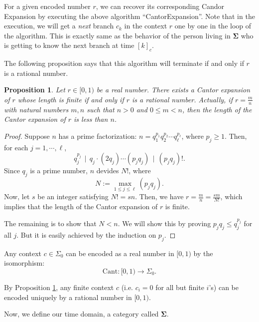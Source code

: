 \documentclass[12pt, a4paper]{amsart}
\theoremstyle{plain}
\newtheorem{prop}[thm]{Proposition}
\theoremstyle{definition}
\numberwithin{figure}{section}
\numberwithin{table}{section}
\newcommand{\lspace} {
  \vspace{0.8\baselineskip}
}
\newcommand{\twc}[2]{ %
  [ #1 ]_{ #2 }
}
\numberwithin{equation}{section}
\newcommand{\bSigma}{\mathbf{\Sigma}}
\begin{document}
For a given encoded number
$r$,
we can recover its corresponding Candor Expansion by executing the above algorithm ``CantorExpansion''.
Note that in the execution, we will get a \textit{next} branch $c_k$ in the context $r$ one by one in the loop of the algorithm.
This is exactly same as the behavior of the person living in $\bSigma$ who is getting to know the next branch at time 
$\twc{k}{c}$.



The following proposition says that this algorithm will terminate if and only if 
$r$ is a rational number.

\begin{prop}
\label{prop:RatCantorExp}
Let 
$r
	\in [0, 1)
$
be a real number.
There exists a 
Cantor expansion of $r$ 
whose length is finite if and only if
$r$ is a rational number.
Actually, if 
$
r = \frac{m}{n}
$
with natural numbers
$m, n$
such that
$n > 0$ and $0 \le m < n$,
then
the length of the Cantor expansion of $r$ is less than $n$.
\end{prop}
\begin{proof}
Suppose $n$
has a prime factorization:
$
n = 
q_1^{p_1}
q_2^{p_2}
	\cdots
q_{\ell}^{p_{\ell}}
$,
where
$p_j \ge 1$.
Then, for each
$j = 1, \cdots, \ell$,
\[
q_j^{p_j}
	\, \mid \,
q_j \cdot
(2  q_j)
	\cdots
(p_j  q_j)
	\, \mid \,
(p_j  q_j)! .
\]
Since 
$q_j$
is a prime number,
$n$
devides
$
N!
$,
where
\[
N
	:=
\max_{1 \le j \le \ell}
	(p_j  q_j) .
\]
Now,
let $s$
be an integer satisfying
$
N! = sn
$.
Then,
we have
$
r
	=
\frac{m}{n}
	=
\frac{sm}{N!}
$,
which implies that the length of the Cantor expansion of $r$ is finite.

The remaining is to show  that
$
N < n
$.
We will show this by proving 
$
p_j q_j \le q_j^{p_j}
$
for all $j$.
But it is easily achieved by the induction on
$p_j$.

\end{proof}


Any context 
$c \in \Sigma_0$
can be encoded as a real number in
$[0,1)$
by the isomorphism:
\[
\mathrm{Cant}
	:
[0,1)
	\to
\Sigma_0 .
\]

By Proposition \ref{prop:RatCantorExp},
any finite context $c$
(i.e. $c_i = 0$ for all but finite $i$'s)
can be encoded uniquely by a rational number in
$[0, 1)$.


\lspace

Now, we define our time domain,
a category called
$\bSigma$.
\end{document}

